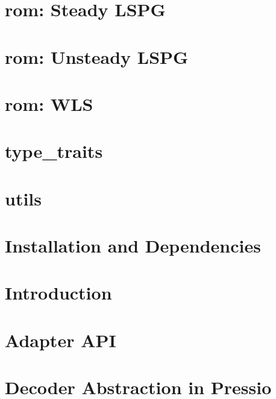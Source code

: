 \let\mypdfximage\pdfximage\def\pdfximage{\immediate\mypdfximage}\documentclass[twoside]{book}
\newcommand{\+}{\discretionary{\mbox{\scriptsize$\hookleftarrow$}}{}{}}
\begin{document}
\chapter{rom\+: Steady LSPG}
\label{md_pages_components_rom_lspg_steady}

\chapter{rom\+: Unsteady LSPG}
\label{md_pages_components_rom_lspg_unsteady}

\chapter{rom\+: WLS}
\label{md_pages_components_rom_wls}

\chapter{type\+\_\+traits}
\label{md_pages_components_type_traits}

\chapter{utils}
\label{md_pages_components_utils}

\chapter{Installation and Dependencies}
\label{md_pages_installation}

\chapter{Introduction}
\label{md_pages_introduction}

\chapter{Adapter API}
\label{md_pages_old_coreconcepts_adapter_api}

\chapter{Decoder Abstraction in Pressio}
\label{md_pages_old_coreconcepts_decoder}

\end{document}
